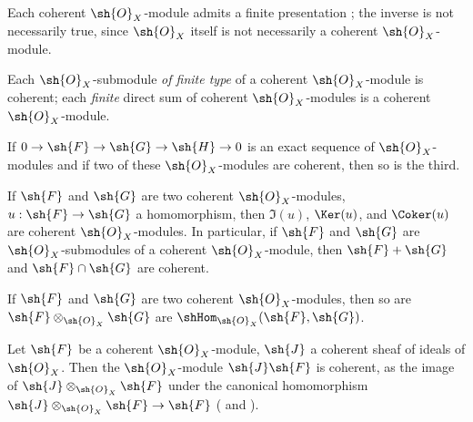 \begin{env}[5.3.2]
\label{0.5.3.2}
Each coherent $\sh{O}_X$-module admits a finite presentation ;
the inverse is not necessarily true, since $\sh{O}_X$ itself is not necessarily a coherent $\sh{O}_X$-module.

Each $\sh{O}_X$-submodule \emph{of finite type} of a coherent $\sh{O}_X$-module is coherent;
each \emph{finite} direct sum of coherent $\sh{O}_X$-modules is a coherent $\sh{O}_X$-module.
\end{env}

\begin{env}[5.3.3]
\label{0.5.3.3}
If $0\to\sh{F}\to\sh{G}\to\sh{H}\to 0$ is an exact sequence of $\sh{O}_X$-modules and if two of these $\sh{O}_X$-modules are coherent, then so is the third.
\end{env}

\begin{env}[5.3.4]
\label{0.5.3.4}
If $\sh{F}$ and $\sh{G}$ are two coherent $\sh{O}_X$-modules, $u:\sh{F}\to\sh{G}$ a homomorphism, then $\Im(u)$, $\Ker(u)$, and $\Coker(u)$ are coherent $\sh{O}_X$-modules.
In particular, if $\sh{F}$ and $\sh{G}$ are $\sh{O}_X$-submodules of a coherent $\sh{O}_X$-module, then $\sh{F}+\sh{G}$ and $\sh{F}\cap\sh{G}$ are coherent.

\end{env}

\begin{env}[5.3.5]
\label{0.5.3.5}
If $\sh{F}$ and $\sh{G}$ are two coherent $\sh{O}_X$-modules, then so are $\sh{F}\otimes_{\sh{O}_X}\sh{G}$ are $\shHom_{\sh{O}_X}(\sh{F},\sh{G})$.
\end{env}

\begin{env}[5.3.6]
\label{0.5.3.6}
Let $\sh{F}$ be a coherent $\sh{O}_X$-module, $\sh{J}$ a coherent sheaf of ideals of $\sh{O}_X$.
Then the $\sh{O}_X$-module $\sh{J}\sh{F}$ is coherent, as the image of $\sh{J}\otimes_{\sh{O}_X}\sh{F}$ under the canonical homomorphism $\sh{J}\otimes_{\sh{O}_X}\sh{F}\to\sh{F}$ ( and ).
\end{env}

